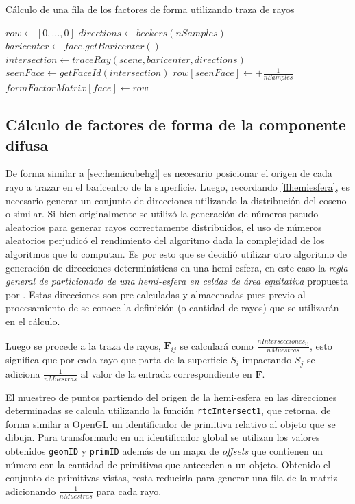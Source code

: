 \begin{algorithm}
	\caption{Cálculo de una fila de los factores de forma utilizando traza de rayos}
	\label{alg:processHemicube}
	\begin{algorithmic}
			\State $row \gets [0,...,0]$
			\State $directions \gets beckers(nSamples)$
			\State $baricenter \gets face.getBaricenter()$
			\State $intersection \gets traceRay(scene, baricenter, directions)$
			\State $seenFace \gets getFaceId(intersection)$
			\State $row[seenFace] \gets + \frac{1}{nSamples}$
			\EndIf
			\EndLoop
			\State $formFactorMatrix[face] \gets  row$
		\EndFunction
	\end{algorithmic}
\end{algorithm}

\subsection{Cálculo de factores de forma de la componente difusa}

De forma similar a \ref{sec:hemicubehgl} es necesario posicionar el origen de cada rayo a trazar en el baricentro de la superficie. Luego, recordando \eqref{ffhemiesfera}, es necesario generar un conjunto de direcciones utilizando la distribución del coseno o similar. Si bien originalmente se utilizó la generación de números pseudo-aleatorios para generar rayos correctamente distribuidos, el uso de números aleatorios perjudicó el rendimiento del algoritmo dada la complejidad de los algoritmos que lo computan. Es por esto que se decidió utilizar otro algoritmo de generación de direcciones determinísticas en una hemi-esfera, en este caso la \textit{regla general de particionado de una hemi-esfera en celdas de área equitativa} propuesta por \citeauthor{Becker}. Estas direcciones son pre-calculadas y almacenadas pues previo al procesamiento de se conoce la definición (o cantidad de rayos) que se utilizarán en el cálculo.

Luego se procede a la traza de rayos, $\mathbf{F}_{ij}$ se calculará como $\frac{nIntersecciones_{ij}}{nMuestras}$, esto significa que por cada rayo que parta de la superficie $S_{i}$ impactando $S_{j}$ se adiciona $\frac{1}{nMuestras}$ al valor de la entrada correspondiente en $\mathbf{F}$.

El muestreo de puntos partiendo del origen de la hemi-esfera en las direcciones determinadas se calcula utilizando la función \verb|rtcIntersect1|, que retorna, de forma similar a OpenGL un identificador de primitiva relativo al objeto que se dibuja. Para transformarlo en un identificador global se utilizan los valores obtenidos \verb|geomID| y \verb|primID| además de un mapa de \textit{offsets} que contienen un número con la cantidad de primitivas que anteceden a un objeto. Obtenido el conjunto de primitivas vistas, resta reducirla para generar una fila de la matriz adicionando $\frac{1}{nMuestras}$ para cada rayo.

